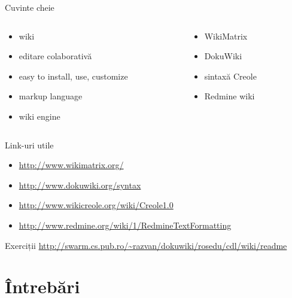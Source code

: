 \documentclass{beamer}
\begin{document}
\begin{frame}{Cuvinte cheie}
  \begin{columns}
    \begin{column}[l]{0.5\textwidth}
      \begin{itemize}
        \item wiki
        \item editare colaborativă
        \item easy to install, use, customize
        \item markup language
        \item wiki engine
      \end{itemize}
    \end{column}
    \begin{column}[l]{0.5\textwidth}
      \begin{itemize}
        \item WikiMatrix
        \item DokuWiki
        \item sintaxă Creole
        \item Redmine wiki
      \end{itemize}
    \end{column}
  \end{columns}
\end{frame}

\begin{frame}{Link-uri utile}
  \begin{itemize}
    \item \url{http://www.wikimatrix.org/}
    \item \url{http://www.dokuwiki.org/syntax}
    \item \url{http://www.wikicreole.org/wiki/Creole1.0}
    \item \url{http://www.redmine.org/wiki/1/RedmineTextFormatting}
  \end{itemize}
\end{frame}

\begin{frame}{Exerciții}
  \footnotesize \url{http://swarm.cs.pub.ro/~razvan/dokuwiki/rosedu/cdl/wiki/readme}
\end{frame}


\section{\^{I}ntrebări}

\frame{\tableofcontents[currentsection]}
\end{document}
